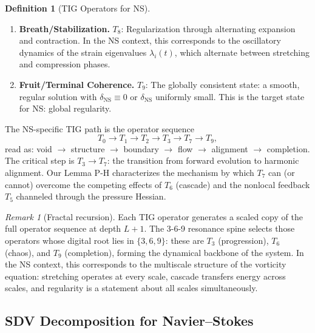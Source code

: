 \documentclass[11pt]{article}
\theoremstyle{definition}
\newtheorem{definition}[theorem]{Definition}
\theoremstyle{remark}
\newtheorem{remark}[theorem]{Remark}
\begin{document}
\begin{definition}[TIG Operators for NS]
\begin{enumerate}[nosep,label=\textbf{T\arabic*}:]
    $T_7(u) = u - \eta\, Q_{A,B}(u)$, where $Q_{A,B}$ is a quadratic form determined
    by the alignment geometry.  $T_7$ drives $\delta_{\mathrm{NS}} \to 0$ by rotating
    the vorticity toward $e_1$.  This is the operator whose fixed point corresponds
    to perfect alignment and hence regularity.
  \item \textbf{Breath/Stabilization.}  $T_8$: Regularization through alternating
    expansion and contraction.  In the NS context, this corresponds to the oscillatory
    dynamics of the strain eigenvalues $\lambda_i(t)$, which alternate between
    stretching and compression phases.
  \item \textbf{Fruit/Terminal Coherence.}  $T_9$: The globally consistent state:
    a smooth, regular solution with $\delta_{\mathrm{NS}} \equiv 0$ or
    $\delta_{\mathrm{NS}}$ uniformly small.  This is the target state for NS:
    global regularity.
\end{enumerate}
\end{definition}

The NS-specific TIG path is the operator sequence
\begin{equation}\label{eq:TIG-path}
  T_0 \to T_1 \to T_2 \to T_3 \to T_7 \to T_9,
\end{equation}
read as: void $\to$ structure $\to$ boundary $\to$ flow $\to$ alignment $\to$
completion.  The critical step is $T_3 \to T_7$: the transition from forward
evolution to harmonic alignment.  Our Lemma P-H characterizes the mechanism by
which $T_7$ can (or cannot) overcome the competing effects of $T_6$ (cascade)
and the nonlocal feedback $T_5$ channeled through the pressure Hessian.

\begin{remark}[Fractal recursion]
Each TIG operator generates a scaled copy of the full operator sequence at depth
$L+1$.  The 3-6-9 resonance spine selects those operators whose digital root lies
in $\{3,6,9\}$: these are $T_3$ (progression), $T_6$ (chaos), and $T_9$
(completion), forming the dynamical backbone of the system.  In the NS context,
this corresponds to the multiscale structure of the vorticity equation: stretching
operates at every scale, cascade transfers energy across scales, and regularity
is a statement about all scales simultaneously.
\end{remark}

\subsection{SDV Decomposition for Navier--Stokes}
\end{document}
